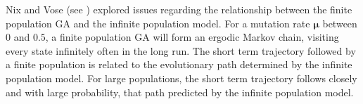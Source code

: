 Nix and Vose (see \cite{Nix1992}) explored issues regarding the relationship between the finite population GA and the infinite population model. 
For a mutation rate $\bm{\mu}$ between $0$ and $0.5$, a finite population GA will form an ergodic Markov chain, visiting every state infinitely often in the long run.
The short term trajectory followed by a finite population is related to 
the evolutionary path determined by the infinite population model. 
For large populations, the short term trajectory follows closely and 
with large probability, that path predicted by 
the infinite population model. 


